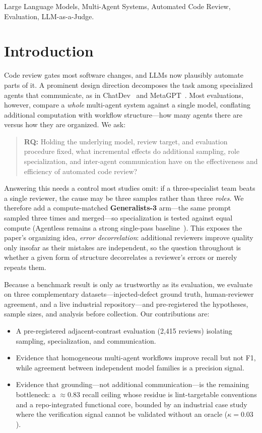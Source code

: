 \documentclass[conference]{IEEEtran}
\begin{document}
\begin{IEEEkeywords}
Large Language Models, Multi-Agent Systems, Automated Code Review, Evaluation,
LLM-as-a-Judge.
\end{IEEEkeywords}

\section{Introduction}

Code review gates most software changes, and LLMs now plausibly automate parts
of it. A prominent design direction decomposes the task among specialized agents
that communicate, as in ChatDev~\cite{chatdev} and MetaGPT~\cite{metagpt}. Most
evaluations, however, compare a \emph{whole} multi-agent system against a single
model, conflating additional computation with workflow structure---how many
agents there are versus how they are organized. We ask:

\begin{quote}
\textbf{RQ:} Holding the underlying model, review target, and evaluation
procedure fixed, what incremental effects do additional sampling, role
specialization, and inter-agent communication have on the effectiveness and
efficiency of automated code review?
\end{quote}

Answering this needs a control most studies omit: if a three-specialist team
beats a single reviewer, the cause may be three samples rather than three
\emph{roles}. We therefore add a compute-matched \textbf{Generalists-3}
arm---the same prompt sampled three times and merged---so specialization is
tested against equal compute (Agentless remains a strong single-pass
baseline~\cite{agentless}). This exposes the paper's organizing idea,
\emph{error decorrelation}: additional reviewers improve quality only insofar as
their mistakes are independent, so the question throughout is whether a given
form of structure decorrelates a reviewer's errors or merely repeats them.

Because a benchmark result is only as trustworthy as its evaluation, we evaluate
on three complementary datasets---injected-defect ground truth, human-reviewer
agreement, and a live industrial repository---and pre-registered the hypotheses,
sample sizes, and analysis before collection. Our contributions are:
\begin{itemize}
  \item A pre-registered adjacent-contrast evaluation (2{,}415 reviews) isolating
  sampling, specialization, and communication.
  \item Evidence that homogeneous multi-agent workflows improve recall but not
  F1, while agreement between independent model families is a precision signal.
  \item Evidence that grounding---not additional communication---is the remaining
  bottleneck: a ${\approx}0.83$ recall ceiling whose residue is lint-targetable
  conventions and a repo-integrated functional core, bounded by an industrial
  case study where the verification signal cannot be validated without an oracle
  ($\kappa{=}0.03$).
\end{itemize}
\end{document}
